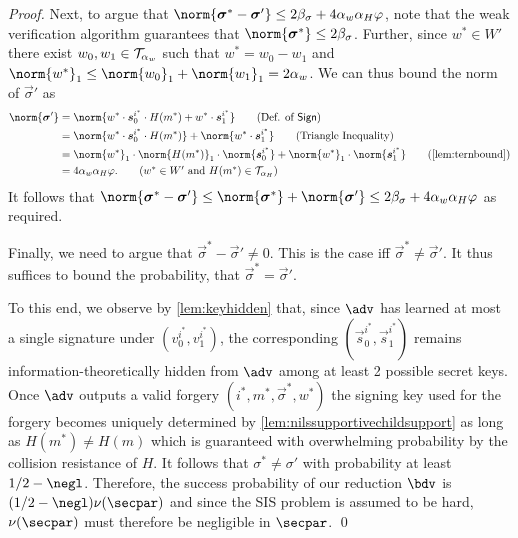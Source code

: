 \begin{proof}
  Next, to argue that $\norm{\vec{\sigma}^*-\vec{\sigma}'}\leq 2\beta_\sigma + 4\alpha_w\alpha_H\varphi$, note that the weak verification algorithm guarantees that $\norm{\vec{\sigma}^*} \leq 2\beta_\sigma$.
  Further, since $w^*\in W'$ there exist $w_0,w_1 \in \mathcal{T}_{\alpha_w}$ such that $w^* = w_0-w_1$ and $\norm{w^*}_1 \leq \norm{w_0}_1 + \norm{w_1}_1 = 2\alpha_w$.
  We can thus bound the norm of $\vec{\sigma}'$ as
  \begin{align*}
    \norm{\vec{\sigma}'} ={}& \norm{w^*\cdot\vec{s}^{i^*}_0\cdot H(m^*)+ w^*\cdot\vec{s}^{i^*}_1}\tag{Def. of $\sign$}\\
    ={}&\norm{w^*\cdot\vec{s}^{i^*}_0\cdot H(m^*)}+ \norm{w^*\cdot\vec{s}^{i^*}_1}\tag{Triangle Inequality}\\
    ={}&\norm{w^*}_1\cdot\norm{H(m^*)}_1\cdot\norm{\vec{s}^{i^*}_0} + \norm{w^*}_1\cdot\norm{\vec{s}^{i^*}_1}\tag{\autoref{lem:ternbound}}\\
    ={}&4\alpha_w\alpha_H\varphi.\tag{$w^*\in W'$ and $H(m^*)\in\tern_{\alpha_H}$}
  \end{align*}
  It follows that $\norm{\vec{\sigma}^*-\vec{\sigma}'} \leq \norm{\vec{\sigma}^*}+\norm{\vec{\sigma}'} \leq 2\beta_\sigma + 4\alpha_w\alpha_H\varphi$ as required.

  Finally, we need to argue that $\vec{\sigma}^*-\vec{\sigma}'\neq 0$.
  This is the case iff $\vec{\sigma}^* \neq \vec{\sigma}'$.
  It thus suffices to bound the probability, that $\vec{\sigma}^*=\vec{\sigma}'$.

  To this end, we observe by \autoref{lem:keyhidden} that, since $\adv$ has learned at most a single signature under $(v_0^{i^*},v_1^{i^*})$, the corresponding $(\vec{s}_0^{i^*},\vec{s}_1^{i^*})$ remains information-theoretically hidden from $\adv$ among at least 2 possible secret keys.
  Once $\adv$ outputs a valid forgery $(i^*,m^*,\vec{\sigma}^*,w^*)$ the signing key used for the forgery becomes uniquely determined by \autoref{lem:nilssupportivechildsupport} as long as $H(m^*)\neq H(m)$ which is guaranteed with overwhelming probability by the collision resistance of $H$.
  It follows that $\sigma^* \neq \sigma'$ with probability at least $1/2 - \negl$.
  Therefore, the success probability of our reduction $\bdv$ is $(1/2 - \negl) \nu(\secpar)$ and since the SIS problem is assumed to be hard, $\nu(\secpar)$ must therefore be negligible in $\secpar$.
  \qed
\end{proof}

